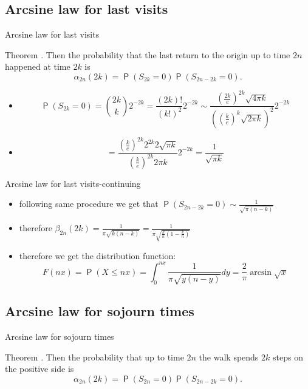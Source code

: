\documentclass{beamer}
\DeclareMathOperator{\pr}{\mathsf{P}}
\begin{document}
\subsection{Arcsine law for last visits}
\begin{frame}{Arcsine law for last visits}

\begin{block}{Theorem}
\Lrws. Then the probability that the last return to the origin up to time $2n$ happened at time $2k$ is
\[
\alpha_{2n} \left( 2k \right)=\pr\left( S_{2k}=0\right)\pr\left( S_{2n-2k}=0\right).
\]
\end{block}

\begin{itemize}
\item<1->\[
   \pr\left( S_{2k}=0\right)=\binom{2k}{k}2^{-2k}
   =\frac{\left( 2k\right)!}{\left(k!\right)^2}2^{-2k}
   \sim \frac{\left( \frac{2k}{e}\right)^{2k}\sqrt{4\pi k}}{\left(\left( \frac{k}{e}\right)^{k}\sqrt{2\pi k}\right)^2}2^{-2k}
\]
\item<2->\[
=\frac{\left( \frac{k}{e}\right)^{2k}2^{2k}2\sqrt{\pi k}}{\left( \frac{k}{e}\right)^{2k}2\pi k}2^{-2k}=\frac{1}{\sqrt{\pi k}}
\]
\end{itemize}
\end{frame}
\begin{frame}{Arcsine law for last visits-continuing}
\begin{itemize}
   \item<1-> following same procedure we get that $\pr\left(S_{2n-2k}=0\right)\sim \frac{1}{\sqrt{\pi \left(n-k\right)}}$
   \item<2-> therefore $\beta_{2n}\left( 2k\right)=\frac{1}{\pi \sqrt{k\left(n-k\right)}}=\frac{1}{\pi \sqrt{\frac{k}{n}\left(1-\frac{k}{n}\right)}}$
   \item<3-> therefore we get the distribution function:
   \[
   F(nx)=\pr(X\leq nx)=\int_0^{nx}\frac{1}{\pi \sqrt{y(n-y)}} dy=\frac{2}{\pi}\arcsin{\sqrt{x}}
   \]
\end{itemize}

\end{frame}

\subsection{Arcsine law for sojourn times}
\begin{frame}{Arcsine law for sojourn times}

\begin{block}{Theorem}
\Lrws. Then the probability that up to time $2n$ the walk spends $2k$ steps on the positive side is
\[
\alpha_{2n} \left( 2k \right)=\pr\left( S_{2n}=0\right)\pr\left( S_{2n-2k}=0\right).
\]
\end{block}
\end{frame}
\end{document}
